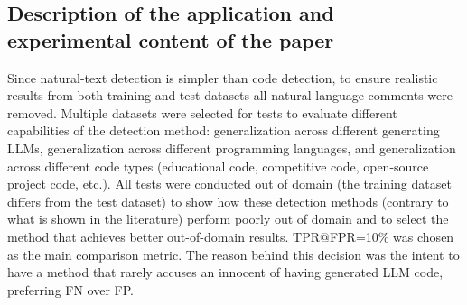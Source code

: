 \subsection*{Description of the application and experimental content of the paper}
\noindent
Since natural-text detection is simpler than code detection, to ensure realistic results from both 
training and test datasets all natural-language comments were removed. Multiple datasets were 
selected for tests to evaluate different capabilities of the detection method: generalization 
across different generating LLMs, generalization across different programming languages, 
and generalization across different code types (educational code, competitive code, open-source 
project code, etc.). All tests were conducted out of domain (the training dataset differs from 
the test dataset) to show how these detection methods (contrary to what is shown in the 
literature) perform poorly out of domain and to select the method that achieves better 
out-of-domain results. TPR@FPR=10\% was chosen as the main comparison metric. 
The reason behind this decision was the intent to have a method that rarely 
accuses an innocent of having generated LLM code, preferring FN over FP.